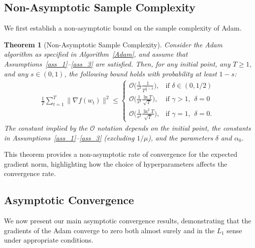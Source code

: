 \documentclass{article} %
\newtheorem{thm}{Theorem}[section]
\begin{document}
\subsection{Non-Asymptotic Sample Complexity}

We first establish a non-asymptotic bound on the sample complexity of Adam.

\begin{thm}[Non-Asymptotic Sample Complexity]
\label{thm:complexity}
Consider the Adam algorithm as specified in Algorithm~\ref{Adam}, and assume that Assumptions~\ref{ass_1}--\ref{ass_3} are satisfied. Then, for any initial point, any \( T \geq 1 \), and any \( s \in (0,1) \), the following bound holds with probability at least \( 1 - s \):
\begin{align*}
 \frac{1}{T}\sum_{t=1}^{T}\|\nabla f(w_{t})\|^{2}\le  \begin{cases} 
\mathcal{O}\Big(\frac{1}{s^2}\frac{1}{T^{\frac{1}{2}-\delta}}\Big), & \text{if }\delta\in(0,1/2)  \\
\mathcal{O}\Big(\frac{1}{s^2}\frac{\ln T}{\sqrt{T}}\Big), & \text{if } \gamma>1,\ \ \delta = 0\\
\mathcal{O}\Big(\frac{1}{s^2}\frac{\ln^{2} T}{\sqrt{T}}\Big), & \text{if } \gamma=1,\ \ \delta = 0.\end{cases} \tag*{\qedhere}
\end{align*}
The constant implied by the \( \mathcal{O} \) notation depends on the initial point, the constants in Assumptions~\ref{ass_1}--\ref{ass_3} (excluding \( 1/\mu \)), and the parameters \( \delta \) and \( \alpha_0 \).
\end{thm}

This theorem provides a non-asymptotic rate of convergence for the expected gradient norm, highlighting how the choice of hyperparameters affects the convergence rate.



\subsection{Asymptotic Convergence}

We now present our main asymptotic convergence results, demonstrating that the gradients of the Adam converge to zero both almost surely and in the \( L_{1} \) sense under appropriate conditions.
\end{document}
